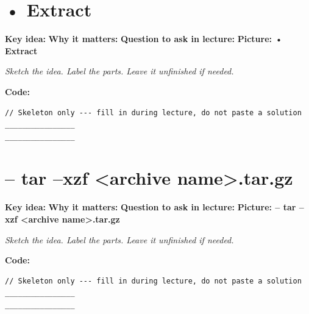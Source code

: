 \documentclass[12pt]{article}
\newcommand{\deflabel}[1]{\noindent\textcolor{slotdef}{\textbf{#1}}}
\newcommand{\drawlabel}[1]{\noindent\textcolor{slotdraw}{\textbf{#1}}}
\begin{document}
\section{• Extract}
\Needspace{0.16\textheight}
\deflabel{Key idea:}
\vspace{1.1em}
\Needspace{0.16\textheight}
\deflabel{Why it matters:}
\vspace{1.1em}
\Needspace{0.16\textheight}
\deflabel{Question to ask in lecture:}
\vspace{1.1em}
\Needspace{0.28\textheight}
\drawlabel{Picture: • Extract}
{\color{slotdraw}
\begin{framed}
\color{ink}
\begin{minipage}[t][0.22\textheight]{\textwidth}
\vspace{0.4em}
\textit{Sketch the idea. Label the parts. Leave it unfinished if needed.}
\end{minipage}
\end{framed}
}
\vspace{1em}
\Needspace{0.18\textheight}
\drawlabel{Code:}
\begin{lstlisting}
// Skeleton only --- fill in during lecture, do not paste a solution
________________
________________
\end{lstlisting}
\vspace{1em}
\section{– tar –xzf <archive name>.tar.gz}
\Needspace{0.16\textheight}
\deflabel{Key idea:}
\vspace{1.1em}
\Needspace{0.16\textheight}
\deflabel{Why it matters:}
\vspace{1.1em}
\Needspace{0.16\textheight}
\deflabel{Question to ask in lecture:}
\vspace{1.1em}
\Needspace{0.28\textheight}
\drawlabel{Picture: – tar –xzf <archive name>.tar.gz}
{\color{slotdraw}
\begin{framed}
\color{ink}
\begin{minipage}[t][0.22\textheight]{\textwidth}
\vspace{0.4em}
\textit{Sketch the idea. Label the parts. Leave it unfinished if needed.}
\end{minipage}
\end{framed}
}
\vspace{1em}
\Needspace{0.18\textheight}
\drawlabel{Code:}
\begin{lstlisting}
// Skeleton only --- fill in during lecture, do not paste a solution
________________
________________
\end{lstlisting}
\vspace{1em}
\end{document}
